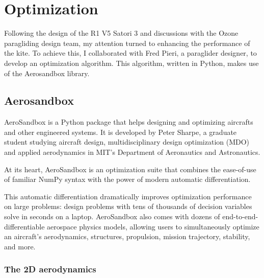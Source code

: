 
\chapter{Optimization} 	%
\label{Chapter2} 		%


Following the design of the R1 V5 Satori 3 and discussions with the Ozone paragliding design team, my attention turned to enhancing the performance of the kite. To achieve this, I collaborated with Fred Pieri, a paraglider designer, to develop an optimization algorithm. This algorithm, written in Python, makes use of the Aerosandbox library.


\section{Aerosandbox}
\label{sec:Ch2.1}

AeroSandbox\cite{aerosandbox} is a Python package that helps designing and optimizing aircrafts and other engineered systems. It is developed by Peter Sharpe, a graduate student studying aircraft design, multidisciplinary design optimization (MDO) and applied aerodynamics in MIT's Department of Aeronautics and Astronautics.

At its heart, AeroSandbox is an optimization suite that combines the ease-of-use of familiar NumPy syntax with the power of modern automatic differentiation.

This automatic differentiation dramatically improves optimization performance on large problems: design problems with tens of thousands of decision variables solve in seconds on a laptop. AeroSandbox also comes with dozens of end-to-end-differentiable aerospace physics models, allowing users to simultaneously optimize an aircraft's aerodynamics, structures, propulsion, mission trajectory, stability, and more.

\subsection{The 2D aerodynamics}
\label{sub:Ch2.1.1}

